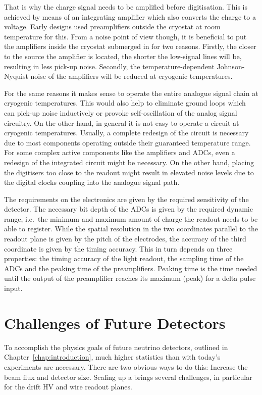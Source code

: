 That is why the charge signal needs to be amplified before digitisation.
This is achieved by means of an integrating amplifier which also converts the charge to a voltage.
Early \lartpc{} designs used preamplifiers outside the cryostat at room temperature for this.
From a noise point of view though, it is beneficial to put the amplifiers inside the cryostat submerged in \lar{} for two reasons.
Firstly, the closer to the source the amplifier is located, the shorter the low-signal lines will be, resulting in less pick-up noise.
Secondly, the temperature-dependent Johnson-Nyquist noise of the amplifiers will be reduced at cryogenic temperatures.

For the same reasons it makes sense to operate the entire analogue signal chain at cryogenic temperatures.
This would also help to eliminate ground loops which can pick-up noise inductively or provoke self-oscillation of the analog signal circuitry.
On the other hand, in general it is not easy to operate a circuit at cryogenic temperatures.
Usually, a complete redesign of the circuit is necessary due to most components operating outside their guaranteed temperature range.
For some complex active components like the amplifiers and ADCs, even a redesign of the integrated circuit might be necessary.
On the other hand, placing the digitisers too close to the readout might result in elevated noise levels due to the digital clocks coupling into the analogue signal path.

The requirements on the electronics are given by the required sensitivity of the detector.
The necessary bit depth of the ADCs is given by the required dynamic range, i.e.\ the minimum and maximum amount of charge the readout needs to be able to register.
While the spatial resolution in the two coordinates parallel to the readout plane is given by the pitch of the electrodes, the accuracy of the third coordinate is given by the timing accuracy.
This in turn depends on three properties: the timing accuracy of the light readout, the sampling time of the ADCs and the peaking time of the preamplifiers.
Peaking time is the time needed until the output of the preamplifier reaches its maximum (peak) for a delta pulse input.


\section{Challenges of Future Detectors}
\label{sec:lartpc_challenges}

To accomplish the physics goals of future neutrino detectors, outlined in Chapter~\ref{chap:introduction}, much higher statistics than with today's experiments are necessary.
There are two obvious ways to do this: Increase the beam flux and detector size.
Scaling up a \lartpc{} brings several challenges, in particular for the drift HV and wire readout planes.

